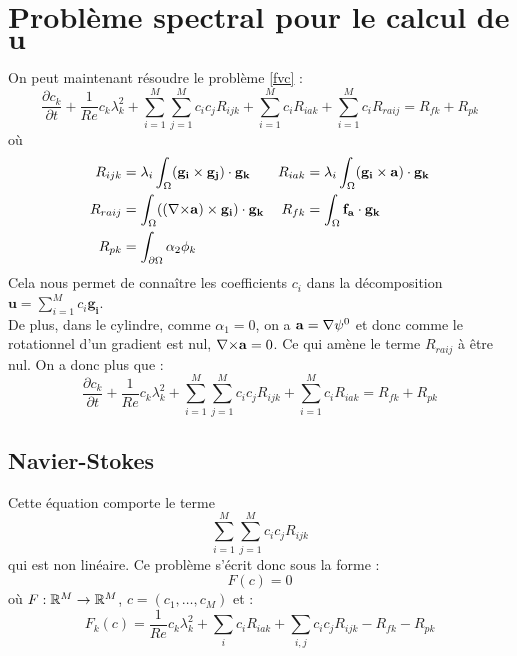 \chapter{Problème spectral pour le calcul de $\mathbf{u}$}
On peut maintenant résoudre le problème \ref{fvc} :
\[ \frac{\partial c_k}{\partial t} + \frac{1}{Re}c_k\lambda_k^2 + \sum_{i=1}^M\sum_{j=1}^Mc_ic_jR_{ijk} + \sum_{i=1}^Mc_iR_{iak} + \sum_{i=1}^Mc_iR_{raij} = R_{fk}+R_{pk} \]
où
\begin{align*}
R_{ijk} &= \lambda_i\int_\Omega(\mathbf{g_i}\times \mathbf{g_j})\cdot\mathbf{g_k} & R_{iak} &= \lambda_i\int_\Omega(\mathbf{g_i}\times \mathbf{a})\cdot\mathbf{g_k}\\
R_{raij} &= \int_\Omega(({\nabla\times}\mathbf{a})\times \mathbf{g_i})\cdot\mathbf{g_k} & R_{fk} &= \int_\Omega\mathbf{f_a}\cdot\mathbf{g_k}\\
R_{pk} &= \int_{\partial\Omega} \alpha_2\phi_k
\end{align*}
Cela nous permet de connaître les coefficients $c_i$ dans la décomposition $\mathbf{u}=\sum_{i=1}^M c_i\mathbf{g_i}$.\\


De plus, dans le cylindre, comme $\alpha_1=0$, on a $\mathbf{a}={\nabla}\psi^0$ et donc comme le rotationnel d'un gradient est nul, ${\nabla\times} \mathbf{a} = 0$. Ce qui amène le terme $R_{raij}$ à être nul. On a donc plus que :
\[ \frac{\partial c_k}{\partial t} + \frac{1}{Re}c_k\lambda_k^2 + \sum_{i=1}^M\sum_{j=1}^Mc_ic_jR_{ijk} + \sum_{i=1}^Mc_iR_{iak} = R_{fk}+R_{pk} \]




\section{Navier-Stokes}
\label{PSNewton}
Cette équation comporte le terme
\[ \sum_{i=1}^M\sum_{j=1}^M c_i c_jR_{ijk} \]
qui est non linéaire. Ce problème s'écrit donc sous la forme :
\[ F(c) = 0 \]
où $F:{\mathbb{R}}^M\rightarrow{\mathbb{R}}^M$, $c=(c_1,\ldots, c_M)$ et :
\begin{equation}\label{psf}
 F_k(c) = \frac{1}{Re} c_k\lambda_k^2 + \sum_i c_i R_{iak} + \sum_{i,j} c_i c_j R_{ijk} - R_{fk} - R_{pk}
\end{equation}

